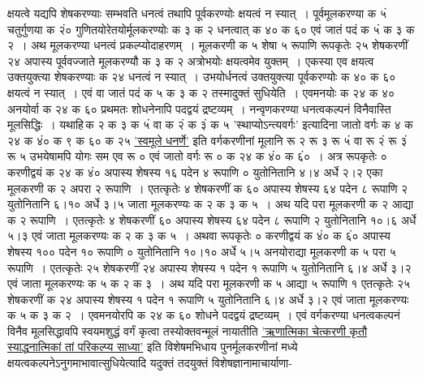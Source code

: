 \documentclass[11pt, openany]{book}
\begin{document}
\newpage

\begin{sloppypar}
\noindent क्षयत्वे यद्यपि शेषकरण्याः सम्भवति धनत्वं तथापि पूर्वकरण्योः क्षयत्वं न स्यात्~। पूर्वमूलकरण्या क ५ं चतुर्गुणया क २ं० गुणितयोरेतयोर्मूलकरण्योः क ३ क २ धनत्वात् क ४० क ६० एवं जातं पदं क ५ं क ३ क २~। अथ मूलकरण्या धनत्वं प्रकल्प्योदाहरणम्~। मूलकरणी क ५ शेषा ५ रूपाणि रूपकृतेः २५ शेषकरणीं २४ अपास्य पूर्ववज्जाते मूलकरण्यौ क ३ क २ अत्रोभयोः क्षयत्वमेव युक्तम्~। एकस्या एव क्षयत्व उक्तयुक्त्या शेषकरण्याः क २४ धनत्वं न स्यात्~। उभयोर्धनत्वं उक्तयुक्त्या पूर्वकरण्योः क ४० क ६० क्षयत्वं न स्यात्~। एवं वा जातं पदं क ५ क ३ क २ तस्मादुक्तं सुधियेति~। एवमनयोः क २४ क ४० अनयोर्वा क २४ क ६० प्रथमतः शोधनेनापि पदद्वयं द्रष्टव्यम्~। नन्वृणकरण्या धनत्वकल्पनं विनैवास्ति मूलसिद्धिः~। यथाहि\textendash \,क २ क ३ क ५ं वा क २ं क ३ं क ५ {\color{violet}'स्थाप्योऽन्त्यवर्गः'} इत्यादिना जातो वर्गः क ४ क २४ क ४ं० क ९ क ६० क २५ \hyperref[1.13]{'स्वमूले धनर्णे'} इति वर्गकरणीनां मूलानि रू २ रू ३ रू ५ं वा रू २ं रू ३ं रू ५ उभयेषामपि योगः सम एव रू ० एवं जातो वर्गः रू ० क २४ क ४ं० क ६ं०~। अत्र रूपकृतेः ० करणीद्वयं क २४ क ४ं० अपास्य शेषस्य १६ पदेन ४ रूपाणि ० युतोनितानि ४।४ अर्धे २।२ एका मूलकरणी क २ अपरा २ रूपाणि~। एतत्कृतेः ४ शेषकरणीं क ६० अपास्य शेषस्य ६४ पदेन ८ रूपाणि २ युतोनितानि ६।१० अर्धे ३।५ जाता मूलकरण्यः क २ क ३ क ५~। अथ यदि परा मूलकरणी क २ आद्या क २ रूपाणि~। एतत्कृतेः ४ शेषकरणीं ६० अपास्य शेषस्य ६४ पदेन ८ रूपाणि २ युतोनितानि १०।६ अर्धे ५।३ एवं जाता मूलकरण्यः क २ क ३ क ५~। अथवा रूपकृतेः ० करणीद्वयं क ४ं० क ६ं० अपास्य शेषस्य १०० पदेन १० रूपाणि ० युतोनितानि १०।१० अर्धे ५।५ अनयोराद्या मूलकरणी क ५ परा ५ रूपाणि~। एतत्कृतेः २५ शेषकरणीं २४ अपास्य शेषस्य १ पदेन १ रूपाणि ५ युतोनितानि ६।४ अर्धे ३।२ एवं जाता मूलकरण्यः क ५ क २ क ३~। अथ यदि परा मूलकरणी क ५ आद्या ५ रूपाणि १ एतत्कृतेः २५ शेषकरणीं क २४ अपास्य शेषस्य १ पदेन १ रूपाणि ५ युतोनितानि ६।४ अर्धे ३।२ एवं जाता मूलकरण्यः क ५ क ३ क २~। एवमनयोरपि क २४ क ६० शोधने पदद्वयं द्रष्टव्यम्~। एवं वर्गकरण्या धनत्वकल्पनं विनैव मूलसिद्धावपि स्वयमशुद्धं वर्गं कृत्वा तस्योक्तवन्मूलं नायातीति \hyperref[4.42]{'ऋणात्मिका चेत्करणी कृतौ स्याद्धनात्मिकां तां परिकल्प्य साध्या'} इति विशेषमभिधाय पुनर्मूलकरणीनां मध्ये क्षयत्वकल्पनेऽनुगमाभावात्सुधियेत्यादि यदुक्तं तदयुक्तं विशेषज्ञानामाचार्याणा-
\end{sloppypar}

\newpage
\end{document}
